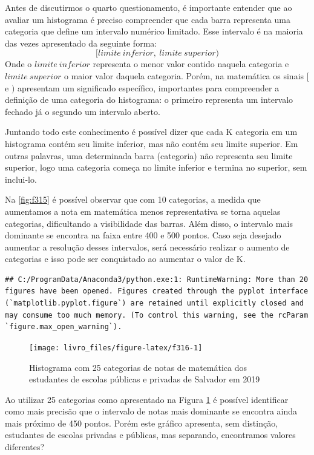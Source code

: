 \documentclass[
  oneside]{book}
\begin{document}
Antes de discutirmos o quarto questionamento, é importante entender que ao avaliar um histograma é preciso compreender que cada barra representa uma categoria que define um intervalo numérico limitado. Esse intervalo é na maioria das vezes apresentado da seguinte forma:
\[[limite\ inferior,\ limite\ superior)\]
Onde o \(limite\ inferior\) representa o menor valor contido naquela categoria e \(limite\ superior\) o maior valor daquela categoria. Porém, na matemática os sinais \([\) e \()\) apresentam um significado específico, importantes para compreender a definição de uma categoria do histograma: o primeiro representa um intervalo fechado já o segundo um intervalo aberto.

Juntando todo este conhecimento é possível dizer que cada K categoria em um histograma contém seu limite inferior, mas não contém seu limite superior. Em outras palavras, uma determinada barra (categoria) não representa seu limite superior, logo uma categoria começa no limite inferior e termina no superior, sem inclui-lo.

Na \ref{fig:f315} é possível observar que com 10 categorias, a medida que aumentamos a nota em matemática menos representativa se torna aquelas categorias, dificultando a visibilidade das barras. Além disso, o intervalo mais dominante se encontra na faixa entre 400 e 500 pontos. Caso seja desejado aumentar a resolução desses intervalos, será necessário realizar o aumento de categorias e isso pode ser conquistado ao aumentar o valor de K.

\begin{verbatim}
## C:/ProgramData/Anaconda3/python.exe:1: RuntimeWarning: More than 20 figures have been opened. Figures created through the pyplot interface (`matplotlib.pyplot.figure`) are retained until explicitly closed and may consume too much memory. (To control this warning, see the rcParam `figure.max_open_warning`).
\end{verbatim}

\begin{figure}

{\centering \texttt{[image: livro\_files/figure-latex/f316-1]} 

}

\caption{Histograma com 25 categorias de notas de matemática dos estudantes de escolas públicas e privadas de Salvador em 2019}\label{fig:f316}
\end{figure}

Ao utilizar 25 categorias como apresentado na Figura \ref{fig:f316} é possível identificar como mais precisão que o intervalo de notas mais dominante se encontra ainda mais próximo de 450 pontos. Porém este gráfico apresenta, sem distinção, estudantes de escolas privadas e públicas, mas separando, encontramos valores diferentes?
\end{document}
